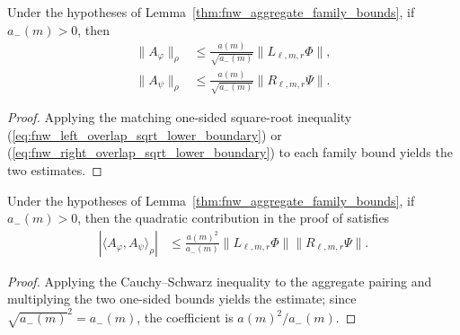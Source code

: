 \begin{lemma}
    \label{thm:fnw_aggregate_sqrt_lower_boundary}
    \leanok
    Under the hypotheses of
    Lemma~\ref{thm:fnw_aggregate_family_bounds}, if $a_-(m)>0$, then
    \begin{align}
        \lVert A_\varphi\rVert_\rho
         & \leq\frac{a(m)}{\sqrt{a_-(m)}}
        \lVert L_{\ell,m,r}\Phi\rVert,
        \label{eq:fnw_left_aggregate_sqrt_bound} \\
        \lVert A_\psi\rVert_\rho
         & \leq\frac{a(m)}{\sqrt{a_-(m)}}
        \lVert R_{\ell,m,r}\Psi\rVert.
        \label{eq:fnw_right_aggregate_sqrt_bound}
    \end{align}
\end{lemma}

\begin{proof}
    \leanok
    Applying the matching one-sided square-root inequality
    (\ref{eq:fnw_left_overlap_sqrt_lower_boundary}) or
    (\ref{eq:fnw_right_overlap_sqrt_lower_boundary}) to each family bound
    yields the two estimates.
\end{proof}

\begin{lemma}
    \label{thm:fnw_aggregate_quadratic}
    \leanok
    Under the hypotheses of
    Lemma~\ref{thm:fnw_aggregate_family_bounds}, if $a_-(m)>0$, then the
    quadratic contribution in the proof of
    \cite[Lemma~6.2]{Fannes1992Finitely} satisfies
    \begin{align}
        |\langle A_\varphi,A_\psi\rangle_\rho|
         & \leq\frac{a(m)^2}{a_-(m)}
        \lVert L_{\ell,m,r}\Phi\rVert
        \lVert R_{\ell,m,r}\Psi\rVert.
        \label{eq:fnw_aggregate_quadratic}
    \end{align}
\end{lemma}

\begin{proof}
    \leanok
    Applying the Cauchy--Schwarz inequality to the aggregate pairing and
    multiplying the two one-sided bounds yields the estimate; since
    $\sqrt{a_-(m)}^2=a_-(m)$, the coefficient is $a(m)^2/a_-(m)$.
\end{proof}

